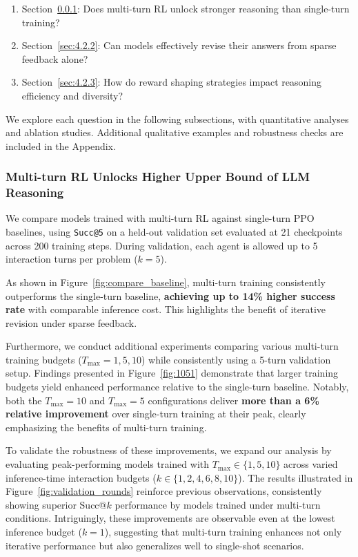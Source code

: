 \begin{enumerate}[noitemsep, topsep=0pt, leftmargin=*]
    \item Section~\ref{sec:4.2.1}: Does multi-turn RL unlock stronger reasoning than single-turn training?
    \item Section~\ref{sec:4.2.2}: Can models effectively revise their answers from sparse feedback alone?
    \item Section~\ref{sec:4.2.3}: How do reward shaping strategies impact reasoning efficiency and diversity?
\end{enumerate}

We explore each question in the following subsections, with quantitative analyses and ablation studies. Additional qualitative examples and robustness checks are included in the Appendix.


\subsubsection{Multi-turn RL Unlocks Higher Upper Bound of LLM Reasoning}


\label{sec:4.2.1} 
We compare models trained with multi-turn RL against single-turn PPO baselines, using \texttt{Succ@5} on a held-out validation set evaluated at 21 checkpoints across 200 training steps. During validation, each agent is allowed up to 5 interaction turns per problem ($k=5$). 

As shown in Figure~\ref{fig:compare_baseline}, multi-turn training consistently outperforms the single-turn baseline, \textbf{achieving up to 14\% higher success rate} with comparable inference cost. This highlights the benefit of iterative revision under sparse feedback.

Furthermore, we conduct additional experiments comparing various multi-turn training budgets ($T_{\text{max}} = 1, 5, 10$) while consistently using a 5-turn validation setup. Findings presented in Figure~\ref{fig:1051} demonstrate that larger training budgets yield enhanced performance relative to the single-turn baseline. Notably, both the $T_{\text{max}}=10$ and $T_{\text{max}}=5$ configurations deliver \textbf{more than a 6\% relative improvement} over single-turn training at their peak, clearly emphasizing the benefits of multi-turn training.



To validate the robustness of these improvements, we expand our analysis by evaluating peak-performing models trained with $T_{\text{max}} \in \{1, 5, 10\}$ across varied inference-time interaction budgets ($k \in \{1, 2, 4, 6, 8, 10\}$). The results illustrated in Figure~\ref{fig:validation_rounds} reinforce previous observations, consistently showing superior Succ@$k$ performance by models trained under multi-turn conditions. Intriguingly, these improvements are observable even at the lowest inference budget ($k=1$), suggesting that multi-turn training enhances not only iterative performance but also generalizes well to single-shot scenarios. 

